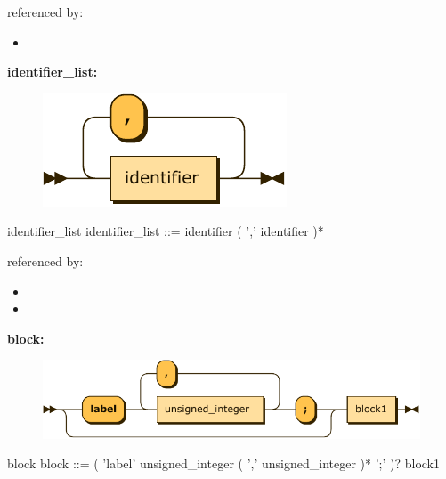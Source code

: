 \documentclass[10pt,a4paper,twoside]{article}
\providecommand{\tightlist}{%
  \setlength{\itemsep}{0pt}\setlength{\parskip}{0pt}}
\newcounter{grammarbox}[section]
\begin{document}
referenced by:

\begin{itemize}
\tightlist
\item
\end{itemize}

\textbf{identifier\_list:}

\begin{figure}[H]
\centering
\includegraphics{diagram/identifier_list.pdf}

\end{figure}

\begin{grammarbox}{identifier\_list}
\vspace{0.5em}
identifier\_list
         ::= identifier ( ',' identifier )*
\end{grammarbox}

referenced by:

\begin{itemize}
\tightlist
\item
\item
\end{itemize}

\textbf{block:}

\begin{figure}[H]
\centering
\includegraphics{diagram/block.pdf}

\end{figure}

\begin{grammarbox}{block}
\vspace{0.5em}
block    ::= ( 'label' unsigned\_integer ( ',' unsigned\_integer )* ';' )? block1
\end{grammarbox}
\end{document}
